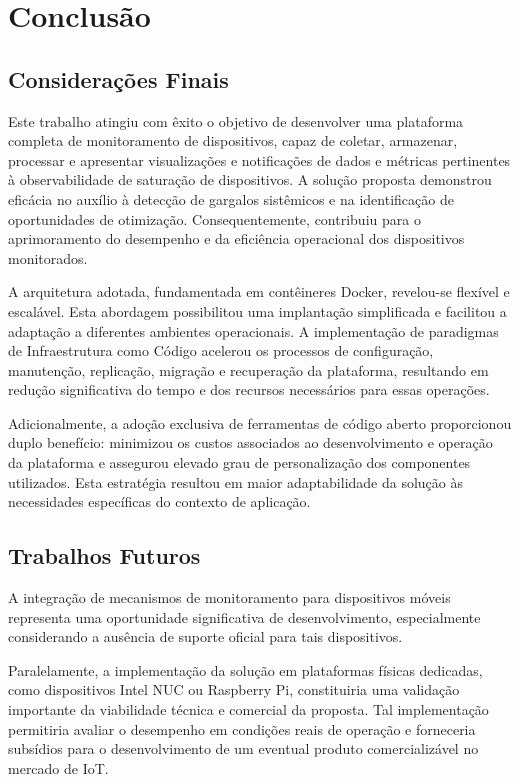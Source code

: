 \chapter{Conclusão}
\label{chap5}

{\color{red}
\section{Considerações Finais}
\label{section:ConsideracoesFinais}

Este trabalho atingiu com êxito o objetivo de desenvolver uma plataforma completa de monitoramento de dispositivos, capaz de coletar, armazenar, processar e apresentar visualizações e notificações de dados e métricas pertinentes à observabilidade de saturação de dispositivos. A solução proposta demonstrou eficácia no auxílio à detecção de gargalos sistêmicos e na identificação de oportunidades de otimização. Consequentemente, contribuiu para o aprimoramento do desempenho e da eficiência operacional dos dispositivos monitorados.

A arquitetura adotada, fundamentada em contêineres Docker, revelou-se flexível e escalável. Esta abordagem possibilitou uma implantação simplificada e facilitou a adaptação a diferentes ambientes operacionais. A implementação de paradigmas de Infraestrutura como Código acelerou os processos de configuração, manutenção, replicação, migração e recuperação da plataforma, resultando em redução significativa do tempo e dos recursos necessários para essas operações.

Adicionalmente, a adoção exclusiva de ferramentas de código aberto proporcionou duplo benefício: minimizou os custos associados ao desenvolvimento e operação da plataforma e assegurou elevado grau de personalização dos componentes utilizados. Esta estratégia resultou em maior adaptabilidade da solução às necessidades específicas do contexto de aplicação.

\section{Trabalhos Futuros}
\label{section:TrabalhosFuturos}

A integração de mecanismos de monitoramento para dispositivos móveis representa uma oportunidade significativa de desenvolvimento, especialmente considerando a ausência de suporte oficial para tais dispositivos.

Paralelamente, a implementação da solução em plataformas físicas dedicadas, como dispositivos Intel NUC ou Raspberry Pi, constituiria uma validação importante da viabilidade técnica e comercial da proposta. Tal implementação permitiria avaliar o desempenho em condições reais de operação e forneceria subsídios para o desenvolvimento de um eventual produto comercializável no mercado de IoT.

}